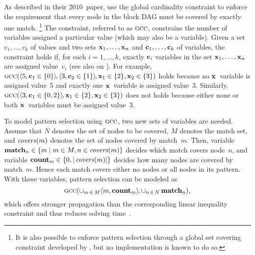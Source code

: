As described in their 2010~paper, \citeauthor{FlochEtAl:2010} use the
\gls{global cardinality constraint} to enforce the requirement that every
\gls{node} in the \gls{block DAG} must be covered by exactly one
\gls{match}.\!%
%
\footnote{%
  It is also possible to enforce \gls{pattern selection} through a \gls{global
    set covering constraint} developed by \textcite{MouthuyEtAl:2007}, but
  no implementation is known to do so.%
}
%
The \gls{constraint}, referred to as $\mGCC$, constrains the number of
\glspl{variable} assigned a particular value (which may also be a
\gls{variable}).
%
Given a set \mbox{$v_1, \ldots, v_k$} of values and two sets \mbox{$\mVar{x}_1,
  \ldots, \mVar{x}_n$} and \mbox{$\mVar{c}_1, \ldots, \mVar{c}_k$} of
\glspl{variable}, the \gls{constraint} holds if, for each \mbox{$i = 1, \ldots,
  k$}, exactly $\mVar{c}_i$ \glspl{variable} in the set \mbox{$\mVar{x}_1,
  \ldots, \mVar{x}_n$} are assigned value~$v_i$ (see also  on
).
%
For example, \mbox{$\mGCC(\mTuple{5, \mVar{c}_1 \in \mSet{0}} \hspace{-1pt},
  \mTuple{3, \mVar{c}_2 \in \mSet{1}} \hspace{-1pt}, \mVar{x}_1 \in \mSet{2},
  \mVar{x}_2 \in \mSet{3})$} holds because no $\mVar{x}$~\gls{variable} is
assigned value~\num{5} and exactly one $\mVar{x}$~\gls{variable} is assigned
value~\num{3}.
%
Similarly, \mbox{$\mGCC(\mTuple{3, \mVar{c}_1 \in \mSet{0, 2}} \hspace{-1pt},
  \mVar{x}_1 \in \mSet{2}, \mVar{x}_2 \in \mSet{3})$} does not holds because
either none or both $\mVar{x}$~\glspl{variable} must be assigned value~\num{3}.

To model \gls{pattern selection} using $\mGCC$, two new sets of \glspl{variable}
are needed.
%
Assume that $N$ denotes the set of \glspl{node} to be covered, $M$ denotes the
\gls{match set}, and $\operatorname{\textrm{\textit{covers}}}(m)$ denotes the set of \glspl{node} covered by
\gls{match}~$m$.
%
Then, \gls{variable} \mbox{$\mVar{match}_n \in \mSetBuilder{m}{m \in M, n \in
    \mCovers(m)}$} decides which \gls{match} covers \gls{node}~$n$, and
\gls{variable} \mbox{$\mVar{count}_m \in \mSet{0, |\mCovers(m)|}$} decides how
many \glspl{node} are covered by \gls{match}~$m$.
%
Hence each match covers either no \glspl{node} or all \glspl{node} in its
\gls{pattern}.
%
With these \glspl{variable}, \gls{pattern selection} can be modeled as
%
\begin{displaymath}
  \mGCC(
    \cup_{m \,\in\, M} \mTuple{m, \mVar{count}_m} \hspace{-1pt},
    \cup_{n \,\in\, N} \, \mVar{match}_n
  ),
\end{displaymath}
%
which offers stronger \gls{propagation} than the corresponding linear inequality
constraint and thus reduces solving time~\cite{FlochEtAl:2010}.

